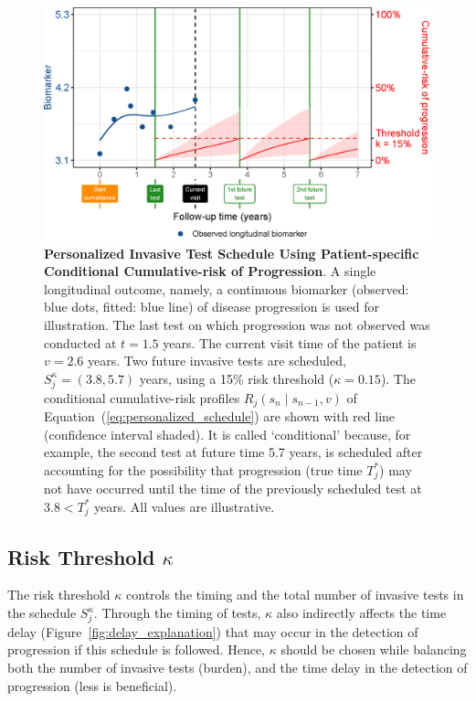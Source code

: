 \begin{figure}
\centerline{\includegraphics{images/schedule_explanation_102.eps}}
\caption{\textbf{Personalized Invasive Test Schedule Using Patient-specific Conditional Cumulative-risk of Progression}.  A single longitudinal outcome, namely, a continuous biomarker (observed: blue dots, fitted: blue line) of disease progression is used for illustration. The last test on which progression was not observed was conducted at $t=1.5$ years. The current visit time of the patient is $v=2.6$ years. Two future invasive tests are scheduled, $S_j^\kappa = (3.8, 5.7)$ years, using a 15\% risk threshold ($\kappa=0.15$). The conditional cumulative-risk profiles $R_j(s_n \mid s_{n-1}, v)$ of Equation~(\ref{eq:personalized_schedule}) are shown with red line (confidence interval shaded). It is called `conditional' because, for example, the second test at future time 5.7 years, is scheduled after accounting for the possibility that progression (true time $T^*_j$) may not have occurred until the time of the previously scheduled test at $3.8 < T^*_j$ years. All values are illustrative.} 
\label{fig:schedule_explanation}
\end{figure}

\subsection{Risk Threshold $\kappa$}
The risk threshold $\kappa$ controls the timing and the total number of invasive tests in the schedule $S_j^{\kappa}$. Through the timing of tests, $\kappa$ also indirectly affects the time delay (Figure~\ref{fig:delay_explanation}) that may occur in the detection of progression if this schedule is followed. Hence, $\kappa$ should be chosen while balancing both the number of invasive tests (burden), and the time delay in the detection of progression (less is beneficial).

